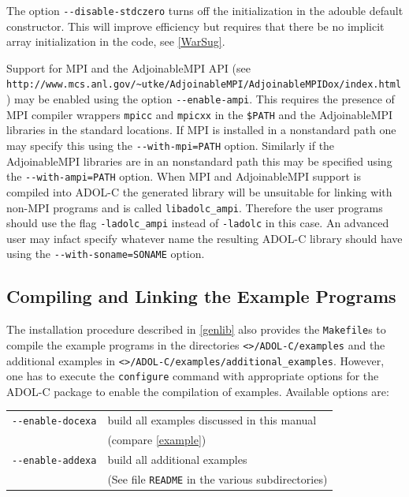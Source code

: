 \documentclass[11pt,twoside]{article}
\begin{document}
The option \verb=--disable-stdczero= turns off the initialization in the {\sf adouble} default 
constructor. This will improve efficiency but requires that there be no implicit array initialization in the code, see 
\autoref{WarSug}.  

Support for MPI and the AdjoinableMPI API (see\\
\verb=http://www.mcs.anl.gov/~utke/AdjoinableMPI/AdjoinableMPIDox/index.html=
) may be enabled using the option \verb=--enable-ampi=. This requires
the presence of MPI compiler wrappers \verb=mpicc= and \verb=mpicxx=
in the \verb=$PATH= and the AdjoinableMPI libraries in the standard
locations. If MPI is installed in a nonstandard path one may specify
this using the \verb?--with-mpi=PATH? option. Similarly if the
AdjoinableMPI libraries are in an nonstandard path this may be
specified using the \verb?--with-ampi=PATH? option.  When MPI and
AdjoinableMPI support is compiled into {\sf ADOL-C} the generated
library will be unsuitable for linking with non-MPI
programs and is called \verb=libadolc_ampi=. Therefore the user
programs should use the flag \verb=-ladolc_ampi= instead of
\verb=-ladolc= in this case. An advanced user may infact specify
whatever name the resulting {\sf ADOL-C} library should have using the
\verb?--with-soname=SONAME? option.


\subsection{Compiling and Linking the Example Programs}
%
The installation procedure described in \autoref{genlib} also
provides the \verb=Makefile=s  to compile the example programs in the
directories \verb=<=\texttt{\packagetar}\verb=>/ADOL-C/examples= and the
additional examples in
\verb=<=\texttt{\packagetar}\verb=>/ADOL-C/examples/additional_examples=. However,
one has to execute the 
\verb=configure= command with  appropriate options for the ADOL-C package to enable the compilation of
examples. Available options are: 
\begin{center}
\begin{tabular}[t]{ll}
\verb=--enable-docexa=&build all examples discussed in this manual\\
&(compare \autoref{example})\\
\verb=--enable-addexa=&build all additional examples\\
&(See file \verb=README= in the various subdirectories)
\end{tabular}
\end{center}
\end{document}
